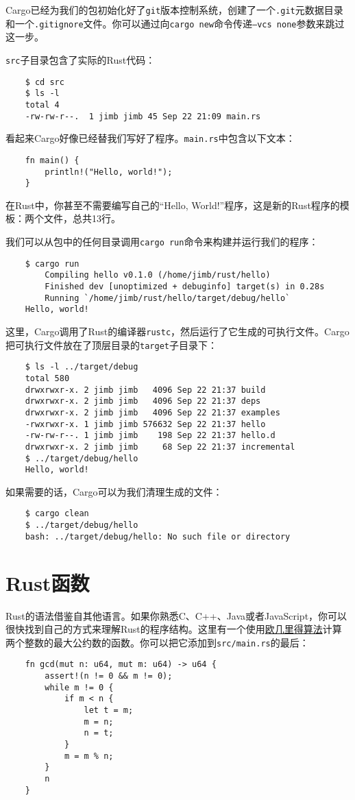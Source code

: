Cargo已经为我们的包初始化好了\texttt{git}版本控制系统，创建了一个\texttt{.git}元数据目录和一个\texttt{.gitignore}文件。你可以通过向\texttt{cargo new}命令传递\texttt{--vcs none}参数来跳过这一步。

\texttt{src}子目录包含了实际的Rust代码：
\begin{verbatim}
    $ cd src
    $ ls -l
    total 4
    -rw-rw-r--.  1 jimb jimb 45 Sep 22 21:09 main.rs
\end{verbatim}

看起来Cargo好像已经替我们写好了程序。\texttt{main.rs}中包含以下文本：
\begin{verbatim}
    fn main() {
        println!("Hello, world!");
    }
\end{verbatim}

在Rust中，你甚至不需要编写自己的“Hello, World!”程序，这是新的Rust程序的模板：两个文件，总共13行。

我们可以从包中的任何目录调用\texttt{cargo run}命令来构建并运行我们的程序：
\begin{verbatim}
    $ cargo run
        Compiling hello v0.1.0 (/home/jimb/rust/hello)
        Finished dev [unoptimized + debuginfo] target(s) in 0.28s
        Running `/home/jimb/rust/hello/target/debug/hello`
    Hello, world!
\end{verbatim}

这里，Cargo调用了Rust的编译器\texttt{rustc}，然后运行了它生成的可执行文件。Cargo把可执行文件放在了顶层目录的\texttt{target}子目录下：
\begin{verbatim}
    $ ls -l ../target/debug
    total 580
    drwxrwxr-x. 2 jimb jimb   4096 Sep 22 21:37 build
    drwxrwxr-x. 2 jimb jimb   4096 Sep 22 21:37 deps
    drwxrwxr-x. 2 jimb jimb   4096 Sep 22 21:37 examples
    -rwxrwxr-x. 1 jimb jimb 576632 Sep 22 21:37 hello
    -rw-rw-r--. 1 jimb jimb    198 Sep 22 21:37 hello.d
    drwxrwxr-x. 2 jimb jimb     68 Sep 22 21:37 incremental
    $ ../target/debug/hello
    Hello, world!
\end{verbatim}

如果需要的话，Cargo可以为我们清理生成的文件：
\begin{verbatim}
    $ cargo clean
    $ ../target/debug/hello
    bash: ../target/debug/hello: No such file or directory
\end{verbatim}

\section{Rust函数}
Rust的语法借鉴自其他语言。如果你熟悉C、C++、Java或者JavaScript，你可以很快找到自己的方式来理解Rust的程序结构。这里有一个使用\href{https://en.wikipedia.org/wiki/Euclidean_algorithm}{欧几里得算法}计算两个整数的最大公约数的函数。你可以把它添加到\texttt{src/main.rs}的最后：
\begin{verbatim}
    fn gcd(mut n: u64, mut m: u64) -> u64 {
        assert!(n != 0 && m != 0);
        while m != 0 {
            if m < n {
                let t = m;
                m = n;
                n = t;
            }
            m = m % n;
        }
        n
    }
\end{verbatim}

